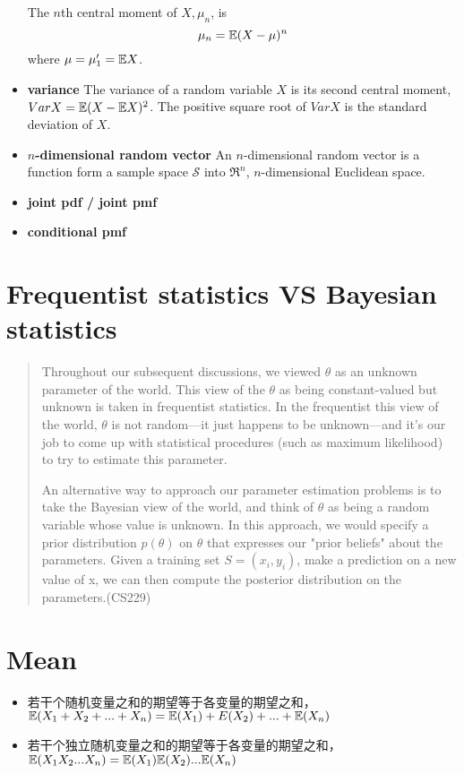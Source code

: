 \begin{itemize}
        The $n$th central moment of $X, \mu_n$, is 
        \begin{equation}
            \mu_n = \mathbb{E}(X - \mu)^n
        \end{equation}
        where $\mu = \mu_1' = \mathbb{E} X$.
    \item \textbf{variance} The variance of a random variable $X$ is its second central moment, $Var X = \mathbb{E}(X - \mathbb{E} X)^2$. The positive square root of $Var X$ is the standard deviation of $X$.
    \item \textbf{$n$-dimensional random vector} An $n$-dimensional random vector is a function form a sample space $\mathcal{S}$ into $\mathfrak{R}^n$, $n$-dimensional Euclidean space.
    \item \textbf{joint pdf / joint pmf}
    \item \textbf{conditional pmf}
\end{itemize}

\section{Frequentist statistics VS Bayesian statistics}
\begin{quotation}
Throughout our subsequent discussions, we viewed $\theta$ as an unknown parameter of the world.
This view of the $\theta$ as being constant-valued but unknown is taken in frequentist statistics.
In the frequentist this view of the world, $\theta$ is not random—it just happens to be unknown—and
it's our job to come up with statistical procedures (such as maximum likelihood) to try to estimate
this parameter.

An alternative way to approach our parameter estimation problems is to take
the Bayesian view of the world, and think of $\theta$ as being a random variable whose value is
unknown. In this approach, we would specify a prior distribution $p(\theta)$ on $\theta$ that
expresses our "prior beliefs" about the parameters. Given a training set $S = {(x_i, y_i)}$,
make a prediction on a new value of x, we can then compute the posterior distribution on
the parameters.(CS229)
\end{quotation}

\section{Mean}
\begin{itemize}
    \item 若干个随机变量之和的期望等于各变量的期望之和，$\mathbb{E}(X_1 + X_2 + ... + X_n) = \mathbb{E}(X_1) + E(X_2) + ... + \mathbb{E}(X_n)$
    \item 若干个独立随机变量之和的期望等于各变量的期望之和，$\mathbb{E}(X_1 X_2 ... X_n) = \mathbb{E}(X_1)\mathbb{E}(X_2)...\mathbb{E}(X_n)$
\end{itemize}

